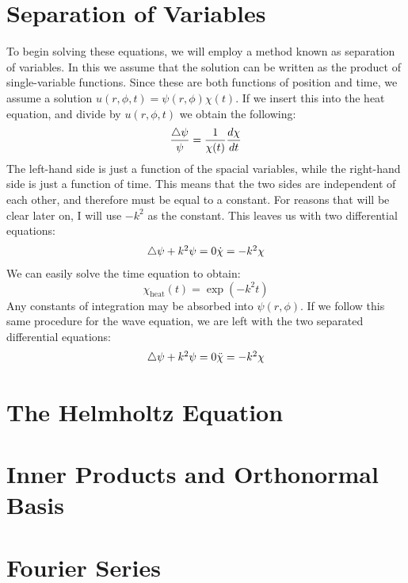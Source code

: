 \documentclass{paper}
\begin{document}
\section{Separation of Variables}
To begin solving these equations, we will employ a method known as separation of variables. In this we assume that the solution can be written as the product of single-variable functions. Since these are both functions of position and time, we assume a solution $u(r,\phi,t)=\psi(r,\phi)\chi(t)$. If we insert this into the heat equation, and divide by $u(r,\phi,t)$ we obtain the following:
\begin{equation}
  \frac{\bigtriangleup \psi}{\psi} = \frac{1}{\chi(t)}\frac{d \chi}{d t}
\end{equation}
The left-hand side is just a function of the spacial variables, while the right-hand side is just a function of time. This means that the two sides are independent of each other, and therefore must be equal to a constant. For reasons that will be clear later on, I will use $-k^2$ as the constant. This leaves us with two differential equations:
\begin{equation}
  \begin{matrix}
    \bigtriangleup\psi+k^2\psi=0
    \dot{\chi}=-k^2 \chi
  \end{matrix}
\end{equation}
We can easily solve the time equation to obtain:
\begin{equation}
  \chi_{\mathrm{heat}}(t)=\exp(-k^2 t)
\end{equation}
Any constants of integration may be absorbed into $\psi(r,\phi)$. If we follow this same procedure for the wave equation, we are left with the two separated differential equations:
\begin{equation}
  \begin{matrix}
    \bigtriangleup\psi+k^2\psi=0
    \ddot{\chi}=-k^2 \chi
  \end{matrix}
\end{equation}
\section{The Helmholtz Equation}
\section{Inner Products and Orthonormal Basis}
\section{Fourier Series}
\end{document}
